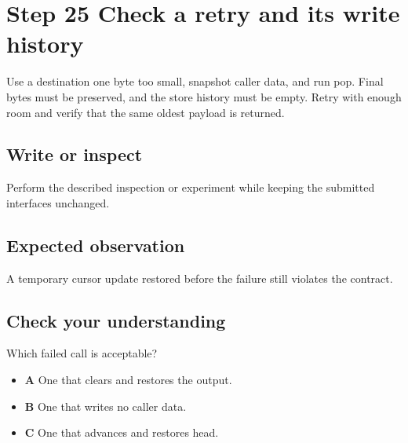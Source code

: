 \section{Step 25 Check a retry and its write history}\label{ring-s25}

Use a destination one byte too small, snapshot caller data, and run pop. Final bytes must be preserved, and the store history must be empty. Retry with enough room and verify that the same oldest payload is returned.

\subsection{Write or inspect}
Perform the described inspection or experiment while keeping the submitted interfaces unchanged.

\subsection{Expected observation}
A temporary cursor update restored before the failure still violates the contract.

\subsection{Check your understanding}
Which failed call is acceptable?

\begin{itemize}
  \item \textbf{A} One that clears and restores the output.
  \item \textbf{B} One that writes no caller data.
  \item \textbf{C} One that advances and restores head.
\end{itemize}
